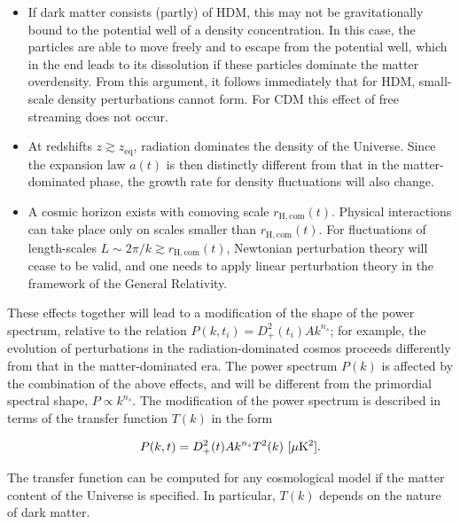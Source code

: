 \documentclass[a4paper,11pt]{article}
\begin{document}
\begin{itemize}
    \item If dark matter consists (partly) of HDM, this may not be gravitationally bound to the potential well of a density concentration. In this case, the particles are able to move freely and to escape from the potential well, which in the end leads to its dissolution if these particles dominate the matter overdensity. From this argument, it follows immediately that for HDM, small-scale density perturbations cannot form. For CDM this effect of free streaming does not occur.
    \item At redshifts $z\gtrsim z_\mathrm{eq}$, radiation dominates the density of the Universe. Since the expansion law $a(t)$ is then distinctly different from that in the matter-dominated phase, the growth rate for density fluctuations will also change.
    \item A cosmic horizon exists with comoving scale $r_\mathrm{H,com}(t)$. Physical interactions can take place only on scales smaller than $r_\mathrm{H,com}(t)$. For fluctuations of length-scales $L\sim2\pi/k\gtrsim r_\mathrm{H,com}(t)$, Newtonian perturbation theory will cease to be valid, and one needs to apply linear perturbation theory in the framework of the General Relativity.
\end{itemize}

{\noindent}These effects together will lead to a modification of the shape of the power spectrum, relative to the relation $P(k,t_i)=D_+^2(t_i)Ak^{n_s}$; for example, the evolution of perturbations in the radiation-dominated cosmos proceeds differently from that in the matter-dominated era. The power spectrum $P(k)$ is affected by the combination of the above effects, and will be different from the primordial spectral shape, $P\propto k^{n_s}$. The modification of the power spectrum is described in terms of the transfer function $T(k)$ in the form

\begin{align*}
    P(k,t) = D_+^2(t) Ak^{n_s}T^2(k)  ~ [{\rm \mu K^2}].
\end{align*}

{\noindent}The transfer function can be computed for any cosmological model if the matter content of the Universe is specified. In particular, $T(k)$ depends on the nature of dark matter.
\end{document}

